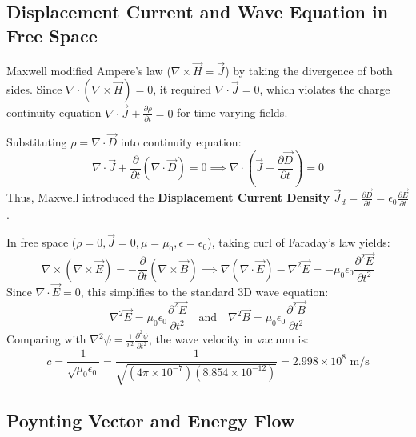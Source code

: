 \documentclass[12pt,a4paper]{article}
\begin{document}
\subsection{Displacement Current and Wave Equation in Free Space}

Maxwell modified Ampere's law ($\nabla \times \vec{H} = \vec{J}$) by taking the divergence of both sides. Since $\nabla \cdot (\nabla \times \vec{H}) = 0$, it required $\nabla \cdot \vec{J} = 0$, which violates the charge continuity equation $\nabla \cdot \vec{J} + \frac{\partial \rho}{\partial t} = 0$ for time-varying fields.

Substituting $\rho = \nabla \cdot \vec{D}$ into continuity equation:
\begin{equation}
\nabla \cdot \vec{J} + \frac{\partial}{\partial t}(\nabla \cdot \vec{D}) = 0 \implies \nabla \cdot \left( \vec{J} + \frac{\partial \vec{D}}{\partial t} \right) = 0
\end{equation}
Thus, Maxwell introduced the \textbf{Displacement Current Density} $\vec{J}_d = \frac{\partial \vec{D}}{\partial t} = \epsilon_0 \frac{\partial \vec{E}}{\partial t}$.

\begin{tcolorbox}[formulabox, title={\textbf{Electromagnetic Wave Equation and Speed of Light}}]
In free space ($\rho = 0, \vec{J} = 0, \mu = \mu_0, \epsilon = \epsilon_0$), taking curl of Faraday's law yields:
\begin{equation}
\nabla \times (\nabla \times \vec{E}) = -\frac{\partial}{\partial t}(\nabla \times \vec{B}) \implies \nabla(\nabla \cdot \vec{E}) - \nabla^2 \vec{E} = -\mu_0 \epsilon_0 \frac{\partial^2 \vec{E}}{\partial t^2}
\end{equation}
Since $\nabla \cdot \vec{E} = 0$, this simplifies to the standard 3D wave equation:
\begin{equation}
\nabla^2 \vec{E} = \mu_0 \epsilon_0 \frac{\partial^2 \vec{E}}{\partial t^2} \quad \text{and} \quad \nabla^2 \vec{B} = \mu_0 \epsilon_0 \frac{\partial^2 \vec{B}}{\partial t^2}
\end{equation}
Comparing with $\nabla^2 \psi = \frac{1}{v^2}\frac{\partial^2\psi}{\partial t^2}$, the wave velocity in vacuum is:
\begin{equation}
c = \frac{1}{\sqrt{\mu_0 \epsilon_0}} = \frac{1}{\sqrt{(4\pi \times 10^{-7}) (8.854 \times 10^{-12})}} = 2.998 \times 10^8 \text{ m/s}
\end{equation}
\end{tcolorbox}

\subsection{Poynting Vector and Energy Flow}
\end{document}

